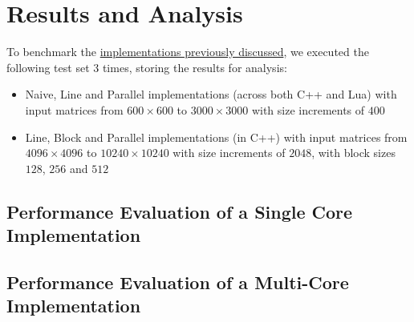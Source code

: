 \section{Results and Analysis} \label{section:results}

To benchmark the \hyperref[section:algorithms]{implementations previously discussed}, we executed the following test set 3 %
times, storing the results for analysis:

\begin{itemize}
    \item Naive, Line and Parallel implementations (across both C++ and Lua) with input matrices from $600 \times 600$ to $3000 \times 3000$ with size increments of $400$
    \item Line, Block and Parallel implementations (in C++) with input matrices from $4096 \times 4096$ to $10240 \times 10240$ with size increments of $2048$, with block sizes $128$, $256$ and $512$
\end{itemize}

\subsection{Performance Evaluation of a Single Core Implementation}


\subsection{Performance Evaluation of a Multi-Core Implementation}

